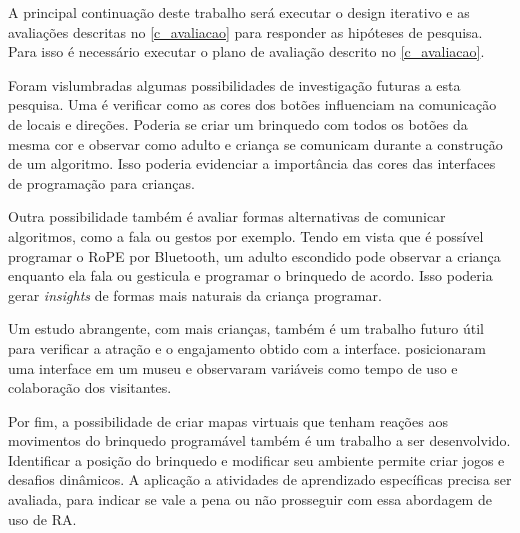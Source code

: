 
A principal continuação deste trabalho será executar o design iterativo e as avaliações descritas no \autoref{c_avaliacao} para responder as hipóteses de pesquisa. Para isso é necessário executar o plano de avaliação descrito no \autoref{c_avaliacao}.

Foram vislumbradas algumas possibilidades de investigação futuras a esta pesquisa. Uma é verificar como as cores dos botões influenciam na comunicação de locais e direções. Poderia se criar um brinquedo com todos os botões da mesma cor e observar como adulto e criança se comunicam durante a construção de um algoritmo. Isso poderia evidenciar a importância das cores das interfaces de programação para crianças.

Outra possibilidade também é avaliar formas alternativas de comunicar algoritmos, como a fala ou gestos por exemplo. Tendo em vista que é possível programar o RoPE por Bluetooth, um adulto escondido pode observar a criança enquanto ela fala ou gesticula e programar o brinquedo de acordo. Isso poderia gerar \textit{insights} de formas mais naturais da criança programar.

Um estudo abrangente, com mais crianças, também é um trabalho futuro útil para verificar a atração e o engajamento obtido com a interface.  posicionaram uma interface em um museu e observaram variáveis como tempo de uso e colaboração dos visitantes.

Por fim, a possibilidade de criar mapas virtuais que tenham reações aos movimentos do brinquedo programável também é um trabalho a ser desenvolvido. Identificar a posição do brinquedo e modificar seu ambiente permite criar jogos e desafios dinâmicos. A aplicação a atividades de aprendizado específicas precisa ser avaliada, para indicar se vale a pena ou não prosseguir com essa abordagem de uso de \acl{RA}.